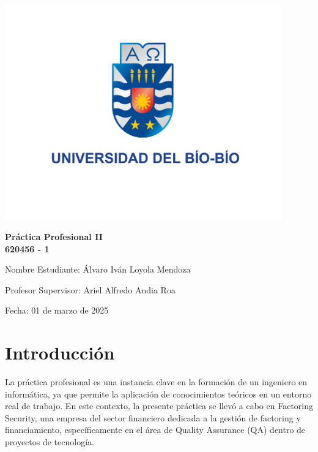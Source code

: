\documentclass[12pt,a4paper]{report}
\begin{document}
\pagestyle{fancy}

\begin{titlepage}
    \thispagestyle{empty} %
    \centering
    \includegraphics[width=12cm]{images/logo-universidad.png}\par
    \vspace{1cm}
    {\huge\bfseries Práctica Profesional II\\[0.5em]620456 - 1\par}
    \vspace{1cm}
    {\Large Nombre Estudiante: Álvaro Iván Loyola Mendoza\par}
    {\Large Profesor Supervisor: Ariel Alfredo Andia Roa\par}
    {\Large Fecha: 01 de marzo de 2025\par}
    \vfill
\end{titlepage}
\setcounter{page}{2}



\tableofcontents
\newpage
\listoffigures
\newpage

\chapter{Introducción}
La práctica profesional es una instancia clave en la formación de un ingeniero en informática, ya que permite la aplicación de conocimientos teóricos en un entorno real de trabajo. En este contexto, la presente práctica se llevó a cabo en Factoring Security, una empresa del sector financiero dedicada a la gestión de factoring y financiamiento, específicamente en el área de Quality Assurance (QA) dentro de proyectos de tecnología.
\end{document}
